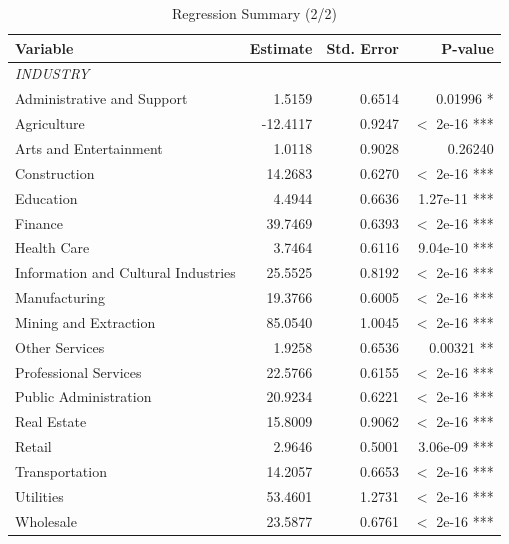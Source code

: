 \documentclass[12pt]{article}
\begin{document}
\begin{table}[ht]
\centering
\caption{Regression Summary (2/2)}
\label{tab:regression-result2of2}
\small
\begin{tabular}{@{}lrrr@{}}
\toprule
\textbf{Variable} & \textbf{Estimate} & \textbf{Std. Error} & \textbf{P-value} \\ \midrule
\textit{INDUSTRY} & & & \\
\quad Administrative and Support & 1.5159 & 0.6514 & 0.01996 * \\
\quad Agriculture & -12.4117 & 0.9247 & $<$ 2e-16 *** \\
\quad Arts and Entertainment & 1.0118 & 0.9028 & 0.26240 \\
\quad Construction & 14.2683 & 0.6270 & $<$ 2e-16 *** \\
\quad Education & 4.4944 & 0.6636 & 1.27e-11 *** \\
\quad Finance & 39.7469 & 0.6393 & $<$ 2e-16 *** \\
\quad Health Care & 3.7464 & 0.6116 & 9.04e-10 *** \\
\quad Information and Cultural Industries & 25.5525 & 0.8192 & $<$ 2e-16 *** \\
\quad Manufacturing & 19.3766 & 0.6005 & $<$ 2e-16 *** \\
\quad Mining and Extraction & 85.0540 & 1.0045 & $<$ 2e-16 *** \\
\quad Other Services & 1.9258 & 0.6536 & 0.00321 ** \\
\quad Professional Services & 22.5766 & 0.6155 & $<$ 2e-16 *** \\
\quad Public Administration & 20.9234 & 0.6221 & $<$ 2e-16 *** \\
\quad Real Estate & 15.8009 & 0.9062 & $<$ 2e-16 *** \\
\quad Retail & 2.9646 & 0.5001 & 3.06e-09 *** \\
\quad Transportation & 14.2057 & 0.6653 & $<$ 2e-16 *** \\
\quad Utilities & 53.4601 & 1.2731 & $<$ 2e-16 *** \\
\quad Wholesale & 23.5877 & 0.6761 & $<$ 2e-16 *** \\
\bottomrule
\end{tabular}
\end{table}
\end{document}
